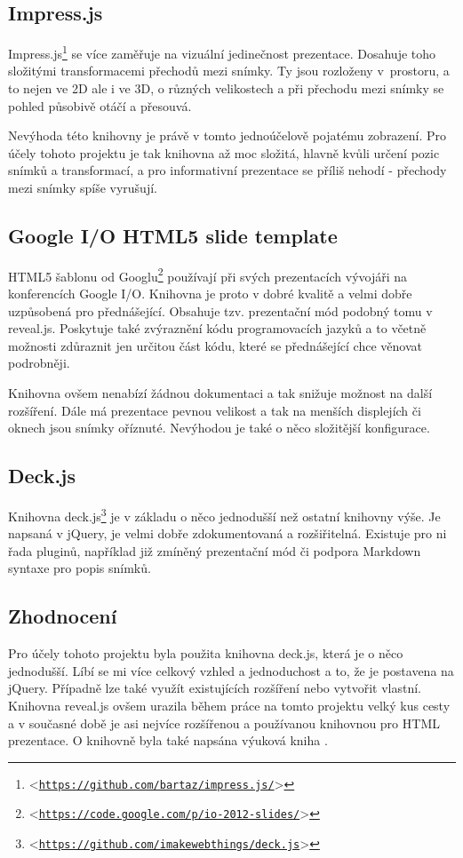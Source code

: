 \documentclass[11pt,twoside,a4paper]{book}
\let\oldUrl\url									%
\renewcommand\url[1]{<\texttt{\oldUrl{#1}}>}
\begin{document}
\subsection{Impress.js}
Impress.js\footnote{\url{https://github.com/bartaz/impress.js/}} se více zaměřuje na vizuální jedinečnost prezentace. Dosahuje toho složitými transformacemi přechodů mezi snímky. Ty jsou rozloženy v~prostoru, a to nejen ve 2D ale i ve 3D, o různých velikostech a při přechodu mezi snímky se pohled působivě otáčí a přesouvá.

Nevýhoda této knihovny je právě v tomto jednoúčelově pojatému zobrazení. Pro účely tohoto projektu je tak knihovna až moc složitá, hlavně kvůli určení pozic snímků a transformací, a pro informativní prezentace se příliš nehodí - přechody mezi snímky spíše vyrušují.

\subsection{Google I/O HTML5 slide template}
HTML5 šablonu od Googlu\footnote{\url{https://code.google.com/p/io-2012-slides/}} používají při svých prezentacích vývojáři na konferencích Google I/O. Knihovna je proto v dobré kvalitě a velmi dobře uzpůsobená pro přednášející. Obsahuje tzv. prezentační mód podobný tomu v reveal.js. Poskytuje také zvýraznění kódu programovacích jazyků a to včetně možnosti zdůraznit jen určitou část kódu, které se přednášející chce věnovat podrobněji.

Knihovna ovšem nenabízí žádnou dokumentaci a tak snižuje možnost na další rozšíření. Dále má prezentace pevnou velikost a tak na menších displejích či oknech jsou snímky oříznuté. Nevýhodou je také o něco složitější konfigurace.

\subsection{Deck.js}
Knihovna deck.js\footnote{\url{https://github.com/imakewebthings/deck.js}} je v základu o něco jednodušší než ostatní knihovny výše. Je napsaná v jQuery, je velmi dobře zdokumentovaná a rozšiřitelná. Existuje pro ni řada pluginů, například již zmíněný prezentační mód či podpora Markdown syntaxe pro popis snímků.

\subsection{Zhodnocení}
Pro účely tohoto projektu byla použita knihovna deck.js, která je o něco jednodušší. Líbí se mi více celkový vzhled a jednoduchost a to, že je postavena na jQuery. Případně lze také využít existujících rozšíření nebo vytvořit vlastní. Knihovna reveal.js ovšem urazila během práce na tomto projektu velký kus cesty a v současné době je asi nejvíce rozšířenou a používanou knihovnou pro HTML prezentace. O knihovně byla také napsána výuková kniha \cite{howtobook}.
\end{document}
